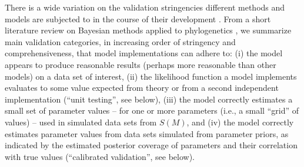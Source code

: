 \documentclass[oneside]{article}
\begin{document}
There is a wide variation on the validation stringencies different
methods and models are subjected to in the course of their
development \citep{darriba18}.
From a short literature review on Bayesian methods applied to
phylogenetics {\color{red}{(Table X)}}, we summarize {\color{red}{four [could be more
    after literature review]}} main validation categories,
in increasing order of stringency and comprehensiveness,
that model implementations can adhere to: (i) the model appears to
produce reasonable results (perhaps more reasonable than other models)
on a data set of interest, (ii) the likelihood function a model
implements evaluates to some value expected from theory or from a
second independent implementation (``unit testing'', see
below), (iii) the model correctly estimates a small set of parameter
values -- for one or more parameters (i.e., a small ``grid'' of
values) -- used in simulated data sets from $S(M)$, and (iv) the model
correctly estimates parameter values from data sets simulated from
parameter priors, as indicated by the estimated posterior coverage of parameters
and their correlation with true values (``calibrated validation'', see
below). {\color{red}{If we want to talk about the next level, from
    those two other guys, we can add it as the 5th possibility and
    expand on it below}}

\end{document}
